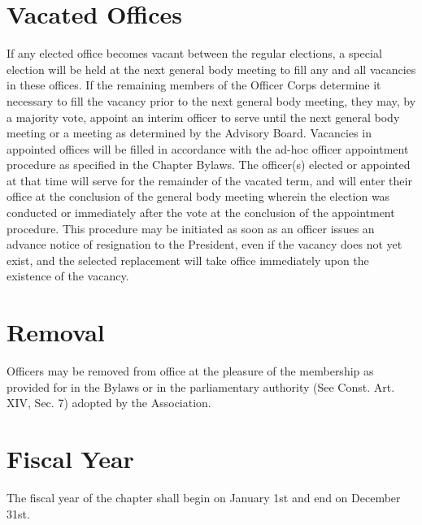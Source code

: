 \section{Vacated Offices}
If any elected office becomes vacant between the regular elections, a special election will be held at the next general body meeting to fill any and all vacancies in these offices.
If the remaining members of the Officer Corps determine it necessary to fill the vacancy prior to the next general body meeting, they may, by a majority vote, appoint an interim officer to serve until the next general body meeting or a meeting as determined by the Advisory Board.
Vacancies in appointed offices will be filled in accordance with the ad-hoc officer appointment procedure as specified in the Chapter Bylaws.
The officer(s) elected or appointed at that time will serve for the remainder of the vacated term, and will enter their office at the conclusion of the general body meeting wherein the election was conducted or immediately after the vote at the conclusion of the appointment procedure.
This procedure may be initiated as soon as an officer issues an advance notice of resignation to the President, even if the vacancy does not yet exist, and the selected replacement will take office immediately upon the existence of the vacancy.

\section{Removal}
Officers may be removed from office at the pleasure of the membership as provided for in the Bylaws or in the parliamentary authority (See Const. Art. XIV, Sec. 7) adopted by the Association.

\section{Fiscal Year}
The fiscal year of the chapter shall begin on January 1st and end on December 31st.



